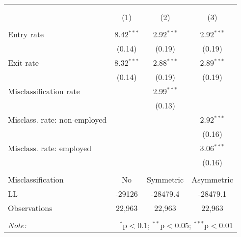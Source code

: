 
\begin{table}[!htbp] \centering 
  \caption{} 
  \label{table_simple_implied} 
\begin{tabular}{@{\extracolsep{5pt}}lccc} 
\\[-1.8ex]\hline 
\hline \\[-1.8ex] 
\\[-1.8ex] & (1) & (2) & (3)\\ 
\hline \\[-1.8ex] 
 Entry rate & 8.42$^{***}$ & 2.92$^{***}$ & 2.92$^{***}$ \\ 
  & (0.14) & (0.19) & (0.19) \\ 
  Exit rate & 8.32$^{***}$ & 2.88$^{***}$ & 2.89$^{***}$ \\ 
  & (0.14) & (0.19) & (0.19) \\ 
  Misclassification rate &  & 2.99$^{***}$ &  \\ 
  &  & (0.13) &  \\ 
  Misclass. rate: non-employed &  &  & 2.92$^{***}$ \\ 
  &  &  & (0.16) \\ 
  Misclass. rate: employed &  &  & 3.06$^{***}$ \\ 
  &  &  & (0.16) \\ 
 \hline \\[-1.8ex] 
Misclassification & No & Symmetric & Asymmetric \\ 
LL & -29126 & -28479.4 & -28479.1 \\ 
Observations & 22,963 & 22,963 & 22,963 \\ 
\hline 
\hline \\[-1.8ex] 
\textit{Note:}  & \multicolumn{3}{r}{$^{*}$p$<$0.1; $^{**}$p$<$0.05; $^{***}$p$<$0.01} \\ 
\end{tabular} 
\end{table} 
